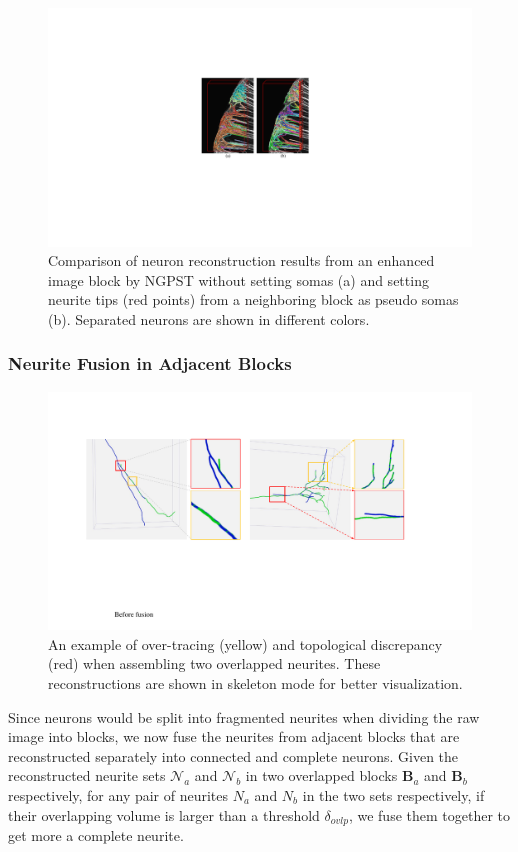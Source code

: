 \begin{figure}[t]
	\centering
	\includegraphics[width=0.85\columnwidth]{./Illustrations/ngpst_pseudosoma.pdf}
	\caption{Comparison of neuron reconstruction results from an enhanced image block by NGPST without setting somas (a) and setting neurite tips (red points) from a neighboring block as pseudo somas (b). Separated neurons are shown in different colors.}
	\label{fig:ngpst_pseudosoma}
\end{figure}



\subsubsection{Neurite Fusion in Adjacent Blocks}
\label{sec:fusion}


\begin{figure}[b]
	\centering
	\includegraphics[width=0.9\columnwidth]{./Illustrations/fusion_errors.pdf}
	\caption{An example of over-tracing (yellow) and topological discrepancy (red) when assembling two overlapped neurites. These reconstructions are shown in skeleton mode for better visualization.}
	\label{fig:overlap_discrepancy}
\end{figure}
Since neurons would be split into fragmented neurites when dividing the raw image into blocks, we now fuse the neurites from adjacent blocks that are reconstructed separately into connected and complete neurons.
Given the reconstructed neurite sets $\mathcal{N}_a$ and $\mathcal{N}_b$ in two overlapped blocks $\mathbf{B}_a$ and $\mathbf{B}_b$ respectively, for any pair of neurites $N_a$ and $N_b$ in the two sets respectively, if their overlapping volume is larger than a threshold $\delta_{ovlp}$, we fuse them together to get more a complete neurite.


